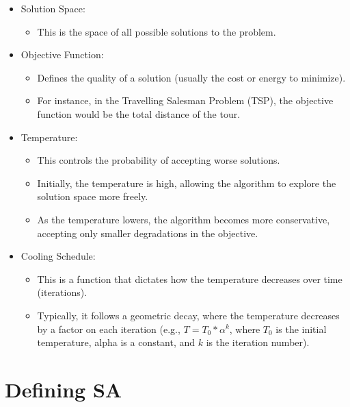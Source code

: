 \documentclass[
  letterpaper,
  DIV=11,
  numbers=noendperiod]{scrreprt}
\providecommand{\tightlist}{%
  \setlength{\itemsep}{0pt}\setlength{\parskip}{0pt}}\usepackage{longtable,booktabs,array}
\begin{document}
\begin{itemize}
\tightlist
\item
  Solution Space:

  \begin{itemize}
  \tightlist
  \item
    This is the space of all possible solutions to the problem.
  \end{itemize}
\item
  Objective Function:

  \begin{itemize}
  \tightlist
  \item
    Defines the quality of a solution (usually the cost or energy to
    minimize).
  \item
    For instance, in the Travelling Salesman Problem (TSP), the
    objective function would be the total distance of the tour.
  \end{itemize}
\item
  Temperature:

  \begin{itemize}
  \tightlist
  \item
    This controls the probability of accepting worse solutions.
  \item
    Initially, the temperature is high, allowing the algorithm to
    explore the solution space more freely.
  \item
    As the temperature lowers, the algorithm becomes more conservative,
    accepting only smaller degradations in the objective.
  \end{itemize}
\item
  Cooling Schedule:

  \begin{itemize}
  \tightlist
  \item
    This is a function that dictates how the temperature decreases over
    time (iterations).
  \item
    Typically, it follows a geometric decay, where the temperature
    decreases by a factor on each iteration (e.g.,
    \(T = T_0 * \alpha^k\), where \(T_0\) is the initial temperature,
    alpha is a constant, and \(k\) is the iteration number).
  \end{itemize}
\end{itemize}

\section{Defining SA}\label{defining-sa}
\end{document}

